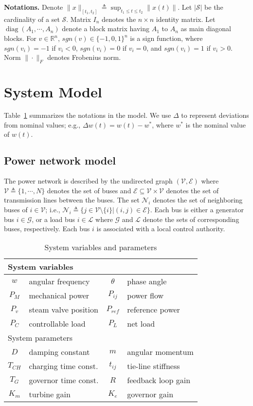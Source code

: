 \documentclass[journal]{IEEEtran}
\newcommand{\real}{\mathds{R}}
\newcommand{\EE}{{\mathcal{E}}}
\newcommand{\GG}{{\mathcal{G}}}
\newcommand{\LL}{{\mathcal{L}}}
\newcommand{\NN}{{\mathcal{N}}}
\newcommand{\VV}{{\mathcal{V}}}
\newcommand{\diag}[1]{\operatorname{diag}(#1)}
\begin{document}
\textbf{Notations.}
Denote $\|x\|_{[t_1,t_2]} \triangleq \sup_{t_1 \leq t \leq t_2} \|x(t)\|$.
Let $|\mathcal{S}|$ be the cardinality of a set $\mathcal{S}$.
Matrix $I_n$ denotes the $n \times n$ identity matrix. Let $\diag{A_1,\cdots,A_n}$ denote a block matrix having $A_1$ to $A_n$ as main diagonal blocks. For $v \in {\real}^n$, $sgn(v) \in \{-1,0,1\}^n$ is a sign function, where $sgn(v_i)=-1$ if $v_i<0$, $sgn(v_i)=0$ if $v_i=0$, and $sgn(v_i)=1$ if $v_i>0$. Norm $\|\cdot\|_F$ denotes Frobenius norm.


\section{System Model}\label{sec:problem-formulation}


Table~\ref{tab:1} summarizes the notations in the model. We use $\Delta$ to represent deviations from nominal values; e.g., $\Delta w(t) = w(t) - w^*$, where $w^*$ is the nominal value of $w(t)$. 

\subsection{Power network model}\label{sec:power-model}
The power network is described by the undirected graph $({\VV},\EE)$ where ${\VV} \triangleq \{1,\cdots,N\}$ denotes the set of buses and $\EE \subseteq {\VV} \times {\VV}$ denotes the set of transmission lines between the buses. The set ${\NN}_i$ denotes the set of neighboring buses of $i \in {\VV}$; i.e., ${{\NN}}_i \triangleq \{j \in {\VV} \setminus \{i\} | (i,j) \in \EE\}$.
Each bus is either a generator bus $i \in {\GG}$, or a load bus $i \in {\LL}$ where ${\GG}$ and ${\LL}$ denote the sets of corresponding buses, respectively. Each bus $i$ is associated with a local control authority.
\begin{table}[t]
 \def\arraystretch{1.00} \centering \normalsize
\caption{System variables and parameters}
\begin{tabular}{clcl}
\multicolumn{4}{l}{{System variables}}\\
\hline 
$w$ &  angular frequency & $\theta$ & phase angle \\
$P_M$ &  mechanical power & $P_{ij}$ & power flow \\
$P_v$ &  steam valve position & $P_{ref}$  & reference power\\
$P_C$ &  controllable load& $P_{L}$ & net load\\
\multicolumn{4}{l}{{System parameters}}\\
\hline
$D$ &  damping constant & $m$ & angular momentum\\
$T_{CH}$ & charging time const. & $t_{ij}$ & tie-line stiffness\\
$T_G$ & governor time const.  & $R$ & feedback loop gain\\
$K_m$ & turbine gain & $K_e$ & governor gain\\ 
\end{tabular}
\vspace{-0.5cm}
\label{tab:1}
\end{table}
\end{document}
